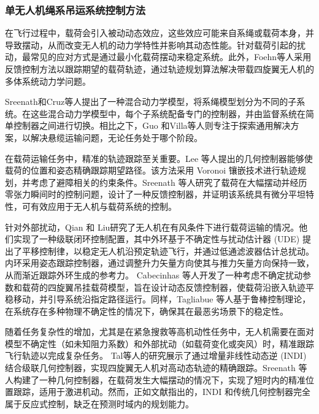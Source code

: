 \documentclass[lang=chs, degree=master, blindreview=true, winfonts=true]{yanputhesis}
\begin{document}
\subsubsection{单无人机绳系吊运系统控制方法}
在飞行过程中，载荷会引入被动动态效应，这些效应可能来自系绳或载荷本身，并导致摆动，从而改变无人机的动力学特性并影响其动态性能。针对载荷引起的扰动，最常见的应对方式是通过最小化载荷摆动来稳定系统\cite{lv2022finite,2019An}。此外，Foehn等人\cite{Foehn-RSS-17}采用反馈控制方法以跟踪期望的载荷轨迹，通过轨迹规划算法解决带载四旋翼无人机的多体系统动力学问题。

Sreenath和Cruz等人\cite{sreenath2013trajectory,cruz2015lift}提出了一种混合动力学模型，将系绳模型划分为不同的子系统。在这些混合动力学模型中，每个子系统配备专门的控制器，并由监督系统在简单控制器之间进行切换。相比之下，Guo 和Villa等人\cite{guo2020multiple,villa2021cooperative}则专注于探索通用解决方案，以解决悬缆运输问题，无论任务处于哪个阶段。

在载荷运输任务中，精准的轨迹跟踪至关重要。Lee 等人\cite{lee2015collision,lee2017geometric}提出的几何控制器能够使载荷的位置和姿态精确跟踪期望路径。该方法采用 Voronoi 镶嵌技术进行轨迹规划，并考虑了避障相关的约束条件。Sreenath 等人\cite{sreenath2013trajectory}研究了载荷在大幅摆动并经历零张力瞬间时的控制问题，设计了一种反馈控制器，并证明该系统具有微分平坦特性，可有效应用于无人机与载荷系统的控制。

针对外部扰动，Qian 和 Liu\cite{qian2019path}研究了无人机在有风条件下进行载荷运输的情况。他们实现了一种级联闭环控制配置，其中外环基于不确定性与扰动估计器 (UDE) 提出了平移控制律，以稳定无人机沿预定轨迹飞行，并通过低通滤波器估计总扰动。内环采用姿态跟踪控制器，通过调整升力矢量方向使其与推力矢量方向保持一致，从而渐近跟踪外环生成的参考力。
Cabecinhas 等人\cite{cabecinhas2019trajectory}开发了一种考虑不确定扰动参数和载荷的四旋翼吊挂载荷模型，旨在设计动态反馈控制器，使载荷沿嵌入轨迹平稳移动，并引导系统沿指定路径运行。同样，Tagliabue 等人\cite{2019Robust}基于鲁棒控制理论，在系统存在多种物理不确定性的情况下，确保其在最恶劣场景下的稳定性。

随着任务复杂性的增加，尤其是在紧急搜救等高机动性任务中，无人机需要在面对模型不确定性（如未知阻力系数）和外部扰动（如载荷变化或突风）时，精准跟踪飞行轨迹以完成复杂任务。
Tal等人\cite{2021Accurate}的研究展示了通过增量非线性动态逆 (INDI) 结合级联几何控制器，实现四旋翼无人机对高动态轨迹的精确跟踪。Sreenath 等人\cite{sreenath2013geometric}构建了一种几何控制器，在载荷发生大幅摆动的情况下，实现了短时内的精准位置跟踪，适用于激进机动。然而，正如文献指出的，INDI 和传统几何控制器完全属于反应式控制，缺乏在预测时域内的规划能力。
\end{document}
